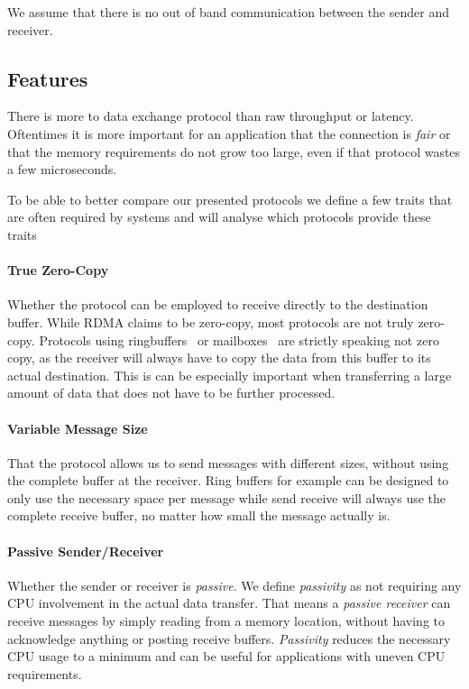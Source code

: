 \begin{rem}
  We assume that there is no out of band communication between the sender and receiver.
\end{rem}




\subsection{Features}

There is more to data exchange protocol than raw throughput or latency. Oftentimes it is more important for an application
that the connection is \emph{fair} or that the memory requirements do not grow too large, even if that protocol wastes
a few microseconds.

To be able to better compare our presented protocols we define a few traits that are often required by systems and will 
analyse which protocols provide these traits

\paragraph{True Zero-Copy} Whether the protocol can be employed to receive directly to the destination buffer. While RDMA 
claims to be zero-copy, most protocols are not truly zero-copy. Protocols using ringbuffers~\cite{} or mailboxes~\cite{} are
strictly speaking not zero copy, as the receiver will always have to copy the data from this buffer to its actual destination.
This is can be especially important when transferring a large amount of data that does not have to be further processed.

\paragraph{Variable Message Size} That the protocol allows us to send messages with different sizes, without using the 
complete buffer at the receiver. Ring buffers for example can be designed to only use the necessary space per message
while send receive will always use the complete receive buffer, no matter how small the message actually is.

\paragraph{Passive Sender/Receiver} Whether the sender or receiver is \emph{passive}. We define \emph{passivity} as not 
requiring any CPU involvement in the actual data transfer. That means a \emph{passive receiver} can receive messages by
simply reading from a memory location, without having to acknowledge anything or posting receive buffers. \emph{Passivity} 
reduces the necessary CPU usage to a minimum and can be useful for applications with uneven CPU requirements.

